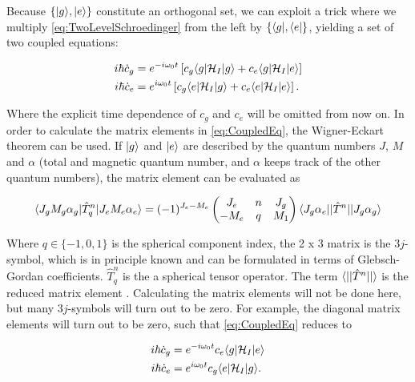 Because $\{\lvert g\rangle,\lvert e\rangle\}$ constitute an orthogonal set, we can exploit a trick where we multiply \cref{eq:TwoLevelSchroedinger} from the left by $\{\langle g\rvert,\langle e\rvert\}$, yielding a set of two coupled equations:

\begin{subequations}\label{eq:CoupledEq}
	\begin{align}
		i \hbar \dot{c}_g &= e^{-i \omega_0 t} 
		\left[c_g \langle g\rvert \mathcal{H}_I \lvert g\rangle + c_e \langle g\rvert \mathcal{H}_I \lvert e\rangle\right]  \\
		i \hbar \dot{c}_e &=  e^{ i \omega_0 t} 
		\left[c_g \langle e\rvert \mathcal{H}_I \lvert g\rangle + c_e \langle e\rvert \mathcal{H}_I \lvert e\rangle\right] .
	\end{align}
\end{subequations}

Where the explicit time dependence of $c_g$ and $c_e$ will be omitted from now on. In order to calculate the matrix elements in \cref{eq:CoupledEq}, the Wigner-Eckart theorem can be used. If $\lvert g\rangle$ and $\lvert e\rangle$ are described by the quantum numbers $J$, $M$ and $\alpha$ (total and magnetic quantum number, and $\alpha$ keeps track of the other quantum numbers), the matrix element can be evaluated as 

\begin{equation}\label{eq:WignerEckart}
	\langle J_g M_g \alpha_g\rvert \hat{T}_q^n \lvert J_e M_e \alpha_e\rangle = 
	(-1)^{J_e-M_e} \begin{pmatrix}
		J_e & n & J_g \\
		-M_e& q & M_1
	\end{pmatrix}
	\langle J_g\alpha_e \rvert | \hat{T}^n | \lvert J_g\alpha_g \rangle
\end{equation}

Where $q \in \{-1,0,1\}$ is the spherical component index, the 2 x 3 matrix is the $3j$-symbol, which is in principle known and can be formulated in terms of  Glebsch-Gordan coefficients. $\hat{T}_q^n$ is the a spherical tensor operator. The term $\langle\rvert|\hat{T}^n|\lvert\rangle$ is the reduced matrix element \cite{Leeuwen2017}. Calculating the matrix elements will not be done here, but many $3j$-symbols will turn out to be zero. For example, the diagonal matrix elements will turn out to be zero, such that \cref{eq:CoupledEq} reduces to

\begin{subequations}\label{eq:NoOffDiagonal}
	\begin{align}
		i \hbar \dot{c}_g &= e^{-i \omega_0 t}  c_e \langle g\rvert \mathcal{H}_I \lvert e\rangle \\
		i \hbar \dot{c}_e &=  e^{ i \omega_0 t} c_g \langle e\rvert \mathcal{H}_I \lvert g\rangle  .
	\end{align}
\end{subequations}


